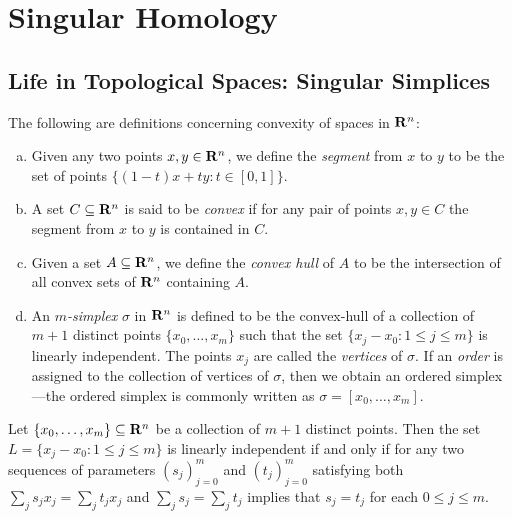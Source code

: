 \section{Singular Homology}

\subsection{Life in Topological Spaces: Singular Simplices}

\begin{definition}[Convexity]
\label{def:convexity}
The following are definitions concerning convexity of spaces in \(\mathbf{R}^n\):
\begin{enumerate}[(a)]\setlength\itemsep{0em}
\item Given any two points \(x, y \in \mathbf{R}^n\), we define the \emph{segment} from
  \(x\) to \(y\) to be the set of points
  \(\{(1-t) x + t y \colon t \in [0, 1]\}\).

\item A set \(C \subseteq \mathbf{R}^n\) is said to be \emph{convex} if for any pair of
  points \(x, y \in C\) the segment from \(x\) to \(y\) is contained in \(C\).

\item Given a set \(A \subseteq \mathbf{R}^n\), we define the \emph{convex hull} of
  \(A\) to be the intersection of all convex sets of \(\mathbf{R}^n\) containing \(A\).

\item An \emph{\(m\)-simplex} \(\sigma\) in \(\mathbf{R}^n\) is defined to be the
  convex-hull of a collection of \(m+1\) distinct points \(\{x_0, \dots, x_m\}\)
  such that the set \(\{x_j - x_0 \colon 1 \leq j \leq m\}\) is linearly
  independent. The points \(x_j\) are called the \emph{vertices} of
  \(\sigma\). If an \emph{order} is assigned to the collection of vertices of
  \(\sigma\), then we obtain an ordered simplex---the ordered simplex is
  commonly written as \(\sigma = [x_0, \dots, x_m]\).
\end{enumerate}
\end{definition}

\begin{lemma}
\label{lem:linear-independence-simplex}
Let \(\{x_0, \dots, x_m\} \subseteq \mathbf{R}^n\) be a collection of \(m+1\) distinct
points. Then the set \(L = \{x_j - x_0 \colon 1 \leq j \leq m\}\) is linearly
independent if and only if for any two sequences of parameters \((s_j)_{j=0}^m\)
and \((t_j)_{j=0}^m\) satisfying both \(\sum_j s_j x_j = \sum_j t_j x_j\) and
\(\sum_j s_j = \sum_j t_j\) implies that \(s_j = t_j\) for each \(0 \leq j \leq m\).
\end{lemma}

